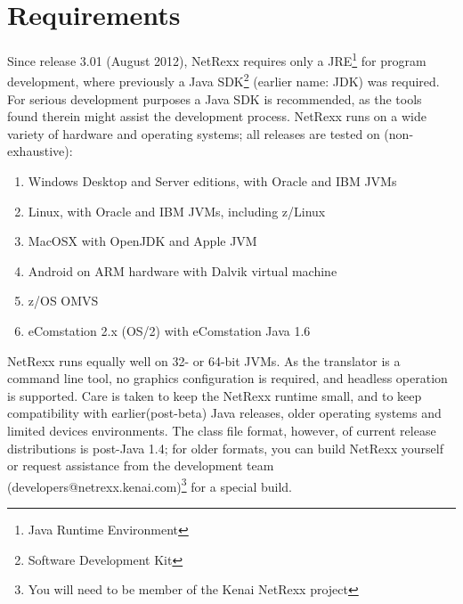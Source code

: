 \chapter{Requirements}
Since release 3.01 (August 2012), NetRexx requires only a
JRE\footnote{Java Runtime Environment} for program development, where previously a
Java SDK\footnote{Software Development Kit} (earlier name: JDK) was required. For serious development
purposes a Java SDK is recommended, as the tools found therein might
assist the development process. NetRexx runs on a wide variety of
hardware and operating systems; all releases are tested on (non-exhaustive):
\begin{enumerate}
\item Windows Desktop and Server editions, with Oracle and IBM JVMs
\item Linux, with Oracle and IBM JVMs, including z/Linux
\item MacOSX with OpenJDK and Apple JVM
\item Android on ARM hardware with Dalvik virtual machine
\item z/OS OMVS
\item eComstation 2.x (OS/2) with eComstation Java 1.6
\end{enumerate}
NetRexx runs equally well on 32- or 64-bit JVMs. As the translator is
a command line tool, no graphics configuration is required, and
headless operation is supported. Care is taken to keep the NetRexx runtime small, and to keep
compatibility with earlier(post-beta) Java releases, older operating systems and
limited devices environments. The class file format, however, of
current release distributions is post-Java 1.4; for older formats, you
can build NetRexx yourself or request assistance from the development
team (\nolinebreak[4]developers@netrexx.kenai.com)\footnote{You will
  need to be member of the Kenai NetRexx project} for a special build.

